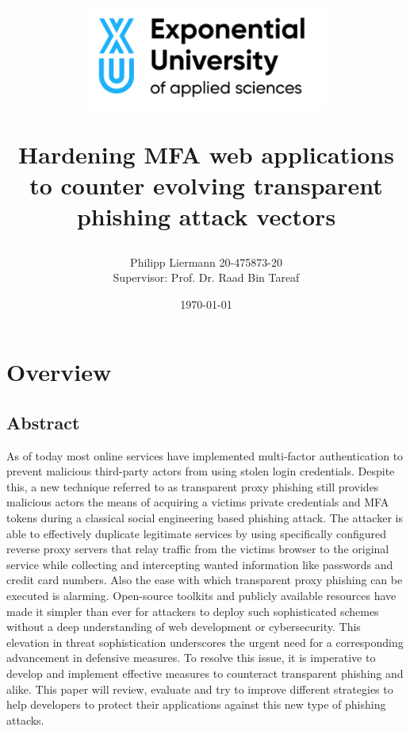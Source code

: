 \documentclass[12pt]{scrbook}
\begin{document}
\author{Philipp Liermann 20-475873-20\\Supervisor: Prof. Dr. Raad Bin Tareaf}
\date{\today}

\title{ \begin{center} \includegraphics[width=8cm]{./images/logo.png}
  \end{center} \vspace{2cm} Hardening MFA web applications to counter evolving
transparent phishing attack vectors \vspace{2cm} \large }

\maketitle

\newpage \tableofcontents

\newpage
\chapter{Overview}
\section{Abstract}
As of today most online services have implemented
multi-factor authentication to prevent malicious third-party actors from using stolen login credentials.
Despite this, a new technique referred to as transparent proxy phishing still provides
malicious actors the means of acquiring a victims private credentials and MFA tokens during a classical
social engineering based phishing attack. The attacker is able to effectively duplicate legitimate services
by using specifically configured reverse proxy servers that relay traffic from the victims browser to the original service
while collecting and intercepting wanted information like passwords and credit card numbers.
Also the ease with which transparent proxy phishing can be executed is alarming. Open-source toolkits and publicly available resources have made it simpler than ever for attackers to deploy such sophisticated schemes without a deep understanding of web development or cybersecurity. This elevation in threat sophistication underscores the urgent need for a corresponding advancement in defensive measures.
To resolve this issue, it is imperative to develop
and implement effective measures to counteract transparent phishing and alike.
This paper will review, evaluate and try to improve different strategies
to help developers to protect their applications against this new type of phishing attacks.
\newpage
\end{document}
